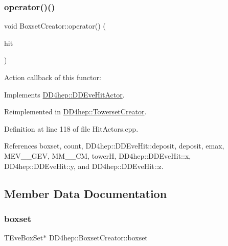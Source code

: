 \subsubsection{\texorpdfstring{operator()()}{operator()()}}
{\footnotesize\ttfamily void Boxset\+Creator\+::operator() (\begin{DoxyParamCaption}\item[{const \hyperlink{class_d_d4hep_1_1_d_d_eve_hit}{D\+D\+Eve\+Hit} \&}]{hit }\end{DoxyParamCaption})\hspace{0.3cm}{\ttfamily [virtual]}}



Action callback of this functor\+: 



Implements \hyperlink{struct_d_d4hep_1_1_d_d_eve_hit_actor_a612a0a84bfe41620203555b044019788}{D\+D4hep\+::\+D\+D\+Eve\+Hit\+Actor}.



Reimplemented in \hyperlink{struct_d_d4hep_1_1_towerset_creator_a5afb1ff94fd502e36e56df19effe7221}{D\+D4hep\+::\+Towerset\+Creator}.



Definition at line 118 of file Hit\+Actors.\+cpp.



References boxset, count, D\+D4hep\+::\+D\+D\+Eve\+Hit\+::deposit, deposit, emax, M\+E\+V\+\_\+\_\+\+G\+EV, M\+M\+\_\+\_\+\+CM, towerH, D\+D4hep\+::\+D\+D\+Eve\+Hit\+::x, D\+D4hep\+::\+D\+D\+Eve\+Hit\+::y, and D\+D4hep\+::\+D\+D\+Eve\+Hit\+::z.



\subsection{Member Data Documentation}
\hypertarget{struct_d_d4hep_1_1_boxset_creator_a6bc0e7f22172b9a51de26b8e74d2e838}{}\label{struct_d_d4hep_1_1_boxset_creator_a6bc0e7f22172b9a51de26b8e74d2e838} 
\subsubsection{\texorpdfstring{boxset}{boxset}}
{\footnotesize\ttfamily T\+Eve\+Box\+Set$\ast$ D\+D4hep\+::\+Boxset\+Creator\+::boxset}



